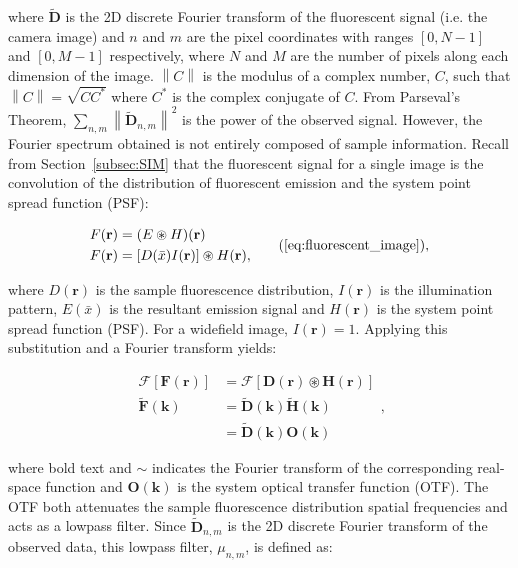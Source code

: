where $\tilde{\textbf{D}}$ is the 2D discrete Fourier transform of 
the fluorescent signal (i.e. the camera image) and $n$ and 
$m$ are the pixel coordinates with ranges $[0, N-1]$ and $[0, M-1]$ 
respectively, where $N$ and $M$ are the number of pixels along each 
dimension of the image. $\left\| C \right\|$ is the modulus of a complex 
number, $C$, such that $\left\| C \right\| = \sqrt{CC^{*}}$ where $C^{*}$ is 
the complex conjugate of $C$. From Parseval's Theorem, $\sum\limits_{n,m}
\left\| \tilde{\textbf{D}}_{n,m} \right\|^2$ is the power of the 
observed signal. However, the Fourier spectrum obtained is not 
entirely composed of sample information. Recall from Section~\ref{subsec:SIM} 
that the fluorescent signal for a single image is the convolution of the 
distribution of fluorescent emission and the system point spread function 
(PSF):

\begin{equation}
\begin{split}
F(\textbf{r}) &= (E \circledast H)(\textbf{r})\\
F(\textbf{r}) &= [D(\bar{x})I(\textbf{r})] \circledast H(\textbf{r}),\\
\end{split}\tag{\ref{eq:fluorescent_image}},
\end{equation}

where $D(\textbf{r})$ is the sample fluorescence distribution, 
$I(\textbf{r})$ is the illumination pattern, $E(\bar{x})$ is
the resultant emission signal and $H(\textbf{r})$ is the system 
point spread function (PSF). For a widefield image, 
$I(\textbf{r}) = 1$. Applying this substitution and a Fourier 
transform yields:

\begin{equation}\label{eq:fluor_signal_fourier}
\begin{split}
\mathcal{F}[\textbf{F}(\textbf{r})] &= \mathcal{F}[\textbf{D}(\textbf{r}) \circledast \textbf{H}(\textbf{r})]\\
\tilde{\textbf{F}}(\textbf{k}) &= \tilde{\textbf{D}}(\textbf{k}) \tilde{\textbf{H}}(\textbf{k})\\
&= \tilde{\textbf{D}}(\textbf{k}) \textbf{O}(\textbf{k})		
\end{split},
\end{equation}

where bold text and $\sim$ indicates the Fourier transform of the corresponding 
real-space function and $\textbf{O}(\textbf{k})$ is the system optical transfer 
function (OTF)\cite{gustafsson2008three}. The OTF both attenuates the sample 
fluorescence distribution spatial frequencies and acts as a lowpass filter. 
Since $\tilde{\textbf{D}}_{n,m}$ is the 2D discrete Fourier transform of 
the observed data, this lowpass filter, $\mu_{n,m}$, is defined as:

